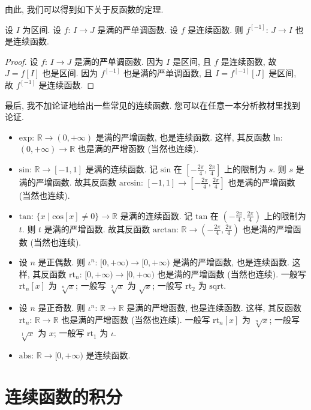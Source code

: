 由此, 我们可以得到如下关于反函数的定理.

\begin{theorem}
    设 $I$ 为区间. 设 $f$: $I \to J$ 是满的严单调函数. 设 $f$ 是连续函数. 则 $f^{[-1]}$: $J \to I$ 也是连续函数.
\end{theorem}

\begin{proof}
    设 $f$: $I \to J$ 是满的严单调函数. 因为 $I$ 是区间, 且 $f$ 是连续函数, 故 $J = f[I]$ 也是区间. 因为 $f^{[-1]}$ 也是满的严单调函数, 且 $I = f^{[-1]} [J]$ 是区间, 故 $f^{[-1]}$ 是连续函数.
\end{proof}

最后, 我不加论证地给出一些常见的连续函数. 您可以在任意一本分析教材里找到论证.
\begin{itemize}
    \item $\mathrm{exp}$: $\mathbb{R} \to (0, +\infty)$ 是满的严增函数, 也是连续函数. 这样, 其反函数 $\mathrm{ln}$: $(0, +\infty) \to \mathbb{R}$ 也是满的严增函数 (当然也连续).
    \item $\mathrm{sin}$: $\mathbb{R} \to [-1, 1]$ 是满的连续函数. 记 $\mathrm{sin}$ 在 $[-\frac{2\pi}{4}, \frac{2\pi}{4}]$ 上的限制为 $s$. 则 $s$ 是满的严增函数. 故其反函数 $\mathrm{arcsin}$: $[-1, 1] \to [-\frac{2\pi}{4}, \frac{2\pi}{4}]$ 也是满的严增函数 (当然也连续).
    \item $\mathrm{tan}$: $\{ x \mid \mathrm{cos}[x] \neq 0 \} \to \mathbb{R}$ 是满的连续函数. 记 $\mathrm{tan}$ 在 $(-\frac{2\pi}{4}, \frac{2\pi}{4})$ 上的限制为 $t$. 则 $t$ 是满的严增函数. 故其反函数 $\mathrm{arctan}$: $\mathbb{R} \to (-\frac{2\pi}{4}, \frac{2\pi}{4})$ 也是满的严增函数 (当然也连续).
    \item 设 $n$ 是正偶数. 则 $\iota^n$: $[0, +\infty) \to [0, +\infty)$ 是满的严增函数, 也是连续函数. 这样, 其反函数 $\mathrm{rt}_n$: $[0, +\infty) \to [0, +\infty)$ 也是满的严增函数 (当然也连续). 一般写 $\mathrm{rt}_n [x]$ 为 $\sqrt[n]{x}$; 一般写 $\sqrt[2]{x}$ 为 $\sqrt{x}$; 一般写 $\mathrm{rt}_2$ 为 $\mathrm{sqrt}$.
    \item 设 $n$ 是正奇数. 则 $\iota^n$: $\mathbb{R} \to \mathbb{R}$ 是满的严增函数, 也是连续函数. 这样, 其反函数 $\mathrm{rt}_n$: $\mathbb{R} \to \mathbb{R}$ 也是满的严增函数 (当然也连续). 一般写 $\mathrm{rt}_n [x]$ 为 $\sqrt[n]{x}$; 一般写 $\sqrt[1]{x}$ 为 $x$; 一般写 $\mathrm{rt}_1$ 为 $\iota$.
    \item $\mathrm{abs}$: $\mathbb{R} \to [0, +\infty)$ 是连续函数.
\end{itemize}

\section{连续函数的积分}


